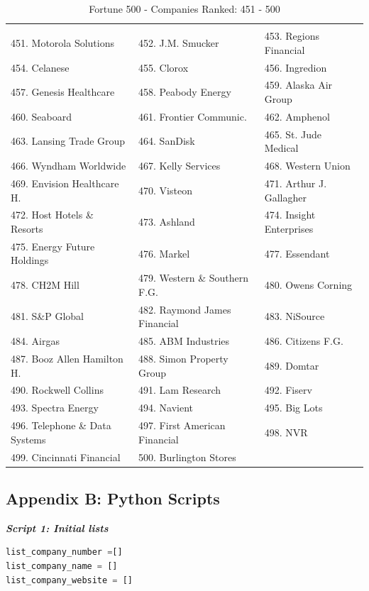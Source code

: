 \documentclass{article}
\begin{document}
\begin{table}[H]
\centering
\caption{Fortune 500 - Companies Ranked: 451 - 500}
\begin{tabular}{lll}
\hline
 \\ 451. Motorola Solutions 
&  452. J.M. Smucker 
&  453. Regions Financial 
\\ 454. Celanese 
&  455. Clorox 
&  456. Ingredion 
\\ 457. Genesis Healthcare 
&  458. Peabody Energy 
&  459. Alaska Air Group 
\\ 460. Seaboard 
&  461. Frontier Communic. 
&  462. Amphenol 
\\ 463. Lansing Trade Group 
&  464. SanDisk 
&  465. St. Jude Medical 
\\ 466. Wyndham Worldwide 
&  467. Kelly Services 
&  468. Western Union 
\\ 469. Envision Healthcare H. 
&  470. Visteon 
&  471. Arthur J. Gallagher 
\\ 472. Host Hotels \& Resorts 
&  473. Ashland 
&  474. Insight Enterprises 
\\ 475. Energy Future Holdings 
&  476. Markel 
&  477. Essendant 
\\ 478. CH2M Hill 
&  479. Western \& Southern F.G. 
&  480. Owens Corning 
\\ 481. S\&P Global 
&  482. Raymond James Financial 
&  483. NiSource 
\\ 484. Airgas 
&  485. ABM Industries 
&  486. Citizens F.G.
\\ 487. Booz Allen Hamilton H. 
&  488. Simon Property Group 
&  489. Domtar 
\\ 490. Rockwell Collins 
&  491. Lam Research 
&  492. Fiserv 
\\ 493. Spectra Energy 
&  494. Navient 
&  495. Big Lots 
\\ 496. Telephone \& Data Systems 
&  497. First American Financial 
&  498. NVR 
\\ 499. Cincinnati Financial 
&  500. Burlington Stores 
&
 \\ \hline

\end{tabular}
\end{table}
\newpage
\subsection{Appendix B: Python Scripts} \label{appP}

\begin{center}
\textit{\textbf{Script 1: Initial lists}}\label{p1}
\end{center}
\begin{lstlisting}[language=Python]
list_company_number =[]
list_company_name = []
list_company_website = []
\end{lstlisting}
\end{document}

